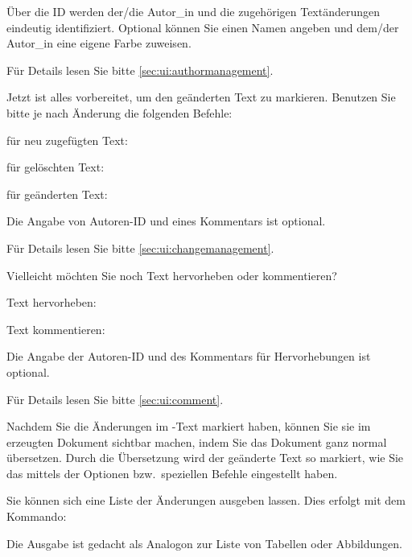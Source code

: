 
Über die ID werden der/die Autor\_in und die zugehörigen Textänderungen eindeutig identifiziert.
Optional können Sie einen Namen angeben und dem/der Autor\_in eine eigene Farbe zuweisen.

Für Details lesen Sie bitte \autoref{sec:ui:authormanagement}.


Jetzt ist alles vorbereitet, um den geänderten Text zu markieren.
Benutzen Sie bitte je nach Änderung die folgenden Befehle:

für neu zugefügten Text:


für gelöschten Text:


für geänderten Text:


Die Angabe von Autoren-ID und eines Kommentars ist optional.

Für Details lesen Sie bitte \autoref{sec:ui:changemanagement}.



Vielleicht möchten Sie noch Text hervorheben oder kommentieren?

Text hervorheben:


Text kommentieren:


Die Angabe der Autoren-ID und des Kommentars für Hervorhebungen ist optional.

Für Details lesen Sie bitte \autoref{sec:ui:comment}.



Nachdem Sie die Änderungen im -Text markiert haben, können Sie sie im erzeugten Dokument sichtbar machen, indem Sie das Dokument ganz normal übersetzen.
Durch die Übersetzung wird der geänderte Text so markiert, wie Sie das mittels der Optionen bzw.\ speziellen Befehle eingestellt haben.


Sie können sich eine Liste der Änderungen ausgeben lassen.
Dies erfolgt mit dem Kommando:


Die Ausgabe ist gedacht als Analogon zur Liste von Tabellen oder Abbildungen.

